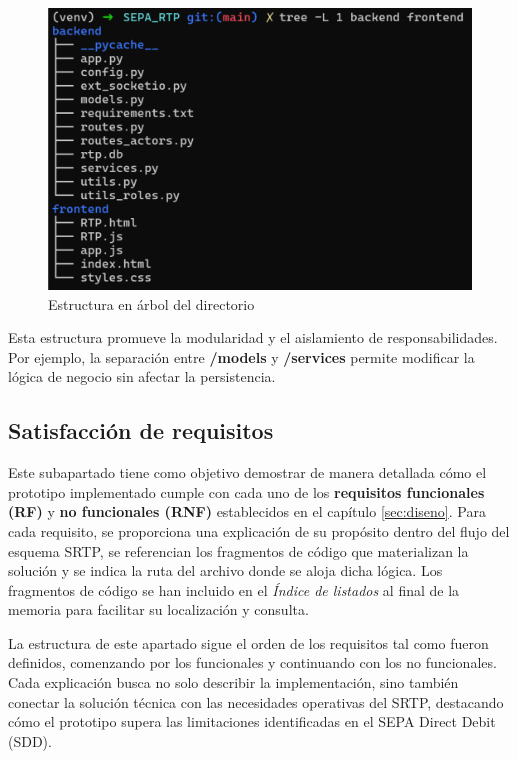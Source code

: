 \begin{figure}[htbp]
  \centering
  \includegraphics[width=.85\textwidth]{Imagenes/treeB.pdf}
  \caption{Estructura en árbol del directorio}
  \label{fig:treeB}
\end{figure}

Esta estructura promueve la modularidad y el aislamiento de responsabilidades. Por ejemplo, la separación entre \textbf{/models} y \textbf{/services} permite modificar la lógica de negocio sin afectar la persistencia.

\subsection{Satisfacción de requisitos}
Este subapartado tiene como objetivo demostrar de manera detallada cómo el prototipo implementado cumple con cada uno de los \textbf{requisitos funcionales (RF)} y \textbf{no funcionales (RNF)} establecidos en el capítulo \ref{sec:diseno}. Para cada requisito, se proporciona una explicación de su propósito dentro del flujo del esquema SRTP, se referencian los fragmentos de código que materializan la solución y se indica la ruta del archivo donde se aloja dicha lógica. Los fragmentos de código se han incluido en el \emph{Índice de listados} al final de la memoria para facilitar su localización y consulta.

La estructura de este apartado sigue el orden de los requisitos tal como fueron definidos, comenzando por los funcionales y continuando con los no funcionales. Cada explicación busca no solo describir la implementación, sino también conectar la solución técnica con las necesidades operativas del SRTP, destacando cómo el prototipo supera las limitaciones identificadas en el SEPA Direct Debit (SDD).

